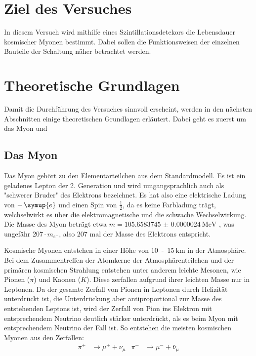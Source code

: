 \section{Ziel des Versuches}
\label{sec:ziel}

    \noindent In diesem Versuch wird mithilfe eines Szintillationsdetekors die Lebensdauer kosmischer Myonen bestimmt. 
    Dabei sollen die Funktionsweisen der einzelnen Bauteile der Schaltung näher betrachtet werden. 

\section{Theoretische Grundlagen}
\label{sec:Theorie}

    \noindent Damit die Durchführung des Versuches sinnvoll erscheint, werden in den nächsten Abschnitten einige theoretischen Grundlagen erläutert. 
    Dabei geht es zuerst um das Myon und 

    \subsection{Das Myon}

        \noindent Das Myon gehört zu den Elementarteilchen aus dem Standardmodell. Es ist ein geladenes Lepton der 2. Generation und wird umgangsprachlich 
        auch als "schwerer Bruder" des Elektrons bezeichnet. Es hat also eine elektrische Ladung von $- \, \symup{e}$ und einen Spin von $\frac{1}{2}$, da es keine 
        Farbladung trägt, welchselwirkt es über die elektromagnetische und die schwache Wechselwirkung. Die Masse des Myon beträgt etwa $m = \SI{105.6583745(24)}{\mega\electronvolt}$ 
        \cite{pdg}, was ungefähr $207 \cdot m_{e^-}$, also $207$ mal der Masse des Elektrons entspricht.   

        \noindent Kosmische Myonen entstehen in einer Höhe von $\num{10}$\, -\, $\SI{15}{\kilo\metre}$ in der Atmosphäre. Bei dem Zusammentreffen der Atomkerne der Atmosphärenteilchen und der primären 
        kosmischen Strahlung entstehen unter anderem leichte Mesonen, wie Pionen ($\pi$) und Kaonen ($K$). Diese zerfallen aufgrund ihrer leichten Masse nur in Leptonen. Da der gesamte 
        Zerfall von Pionen in Leptonen durch Helizität unterdrückt ist, die Unterdrückung aber antiproportional zur Masse des entstehenden Leptons ist, wird der Zerfall von Pion ins 
        Elektron mit entsprechendem Neutrino deutlich stärker unterdrückt, als es beim Myon mit entsprechendem Neutrino der Fall ist. So entstehen die meisten kosmischen Myonen aus den 
        Zerfällen: 
        \begin{align*}
            \pi^+ &\rightarrow \mu^+ + \nu_{\mu} & \pi^- &\rightarrow \mu^- + \bar{\nu}_{\mu}
        \end{align*}

